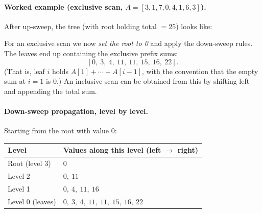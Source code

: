 \paragraph{Worked example (exclusive scan, $A = [3,1,7,0,4,1,6,3]$).}

After up-sweep, the tree (with root holding total $=25$) looks like:
\begin{center}
\end{center}

\noindent For an exclusive scan we now \emph{set the root to 0} and apply
the down-sweep rules. The leaves end up containing the exclusive prefix
sums:
\[
[0,\ 3,\ 4,\ 11,\ 11,\ 15,\ 16,\ 22].
\]
(That is, leaf $i$ holds $A[1]+\cdots+A[i-1]$, with the convention that
the empty sum at $i=1$ is $0$.) An inclusive scan can be obtained from this
by shifting left and appending the total sum.

\paragraph{Down-sweep propagation, level by level.}
Starting from the root with value $0$:

\begin{center}
\begin{tabular}{l l}
\toprule
\textbf{Level} & \textbf{Values along this level (left $\to$ right)} \\
\midrule
Root (level 3) & $0$ \\
Level 2        & $0,\ 11$ \\
Level 1        & $0,\ 4,\ 11,\ 16$ \\
Level 0 (leaves)
              & $0,\ 3,\ 4,\ 11,\ 11,\ 15,\ 16,\ 22$ \\
\bottomrule
\end{tabular}
\end{center}

